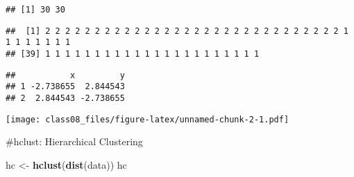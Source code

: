 \documentclass[
]{article}
\newenvironment{Shaded}{\begin{snugshade}}{\end{snugshade}}
\newcommand{\CommentTok}[1]{\textcolor[rgb]{0.56,0.35,0.01}{\textit{#1}}}
\newcommand{\DataTypeTok}[1]{\textcolor[rgb]{0.13,0.29,0.53}{#1}}
\newcommand{\DecValTok}[1]{\textcolor[rgb]{0.00,0.00,0.81}{#1}}
\newcommand{\KeywordTok}[1]{\textcolor[rgb]{0.13,0.29,0.53}{\textbf{#1}}}
\newcommand{\NormalTok}[1]{#1}
\newcommand{\OperatorTok}[1]{\textcolor[rgb]{0.81,0.36,0.00}{\textbf{#1}}}
\newcommand{\StringTok}[1]{\textcolor[rgb]{0.31,0.60,0.02}{#1}}
\begin{document}
\begin{verbatim}
## [1] 30 30
\end{verbatim}

\begin{Shaded}
\end{Shaded}

\begin{verbatim}
##  [1] 2 2 2 2 2 2 2 2 2 2 2 2 2 2 2 2 2 2 2 2 2 2 2 2 2 2 2 2 2 2 1 1 1 1 1 1 1 1
## [39] 1 1 1 1 1 1 1 1 1 1 1 1 1 1 1 1 1 1 1 1 1 1
\end{verbatim}

\begin{Shaded}
\end{Shaded}

\begin{verbatim}
##           x         y
## 1 -2.738655  2.844543
## 2  2.844543 -2.738655
\end{verbatim}

\begin{Shaded}
\end{Shaded}

\texttt{[image: class08\_files/figure-latex/unnamed-chunk-2-1.pdf]}

\#hclust: Hierarchical Clustering

\begin{Shaded}
\begin{Highlighting}[]
\NormalTok{hc <-}\StringTok{ }\KeywordTok{hclust}\NormalTok{(}\KeywordTok{dist}\NormalTok{(data))}
\NormalTok{hc}
\end{Highlighting}
\end{Shaded}
\end{document}
